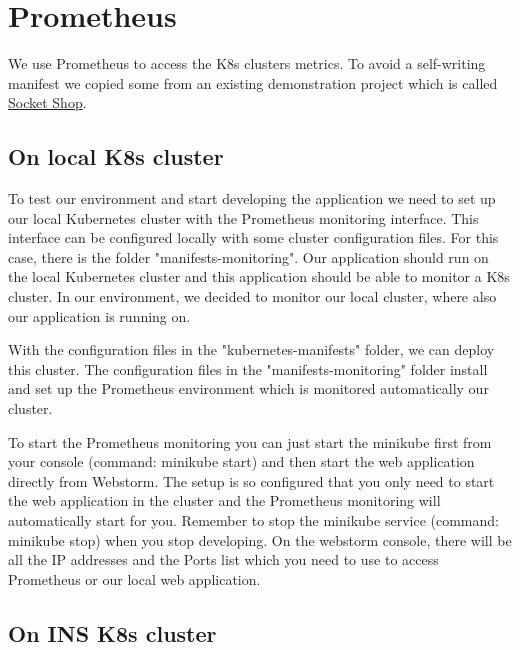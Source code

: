 \chapter{Prometheus}
We use Prometheus to access the K8s clusters metrics. To avoid a self-writing manifest we copied some from an existing demonstration project which is called \href{https://github.com/microservices-demo/microservices-demo}{Socket Shop}.

\section{On local K8s cluster}
To test our environment and start developing the application we need to set up our local Kubernetes cluster with the Prometheus monitoring interface. This interface can be configured locally with some cluster configuration files. For this case, there is the folder "manifests-monitoring". Our application should run on the local Kubernetes cluster and this application should be able to monitor a K8s cluster. In our environment, we decided to monitor our local cluster, where also our application is running on.

With the configuration files in the "kubernetes-manifests" folder, we can deploy this cluster. The configuration files in the "manifests-monitoring" folder install and set up the Prometheus environment which is monitored automatically our cluster.

To start the Prometheus monitoring you can just start the minikube first from your console (command: minikube start) and then start the web application directly from Webstorm. The setup is so configured that you only need to start the web application in the cluster and the Prometheus monitoring will automatically start for you. Remember to stop the minikube service (command: minikube stop) when you stop developing. On the webstorm console, there will be all the IP addresses and the Ports list which you need to use to access Prometheus or our local web application.

\section{On INS K8s cluster}